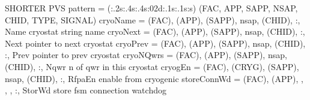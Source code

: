 \documentclass[letterpaper,10pt,english]{sphinxmanual}
\begin{document}
\begin{sphinxVerbatim}[commandchars=\\\{\}]
\PYGZsh{}SHORTER PVS
\PYGZgt{} pattern = (\PYGZob{}:.2s\PYGZcb{}\PYGZob{}:.4s\PYGZcb{}\PYGZob{}:.4s\PYGZcb{}\PYGZob{}:02d\PYGZcb{}\PYGZob{}:.1s\PYGZcb{}\PYGZob{}:.1s\PYGZcb{}\PYGZob{}:s\PYGZcb{}) (FAC, APP, SAPP, NSAP, CHID, TYPE, SIGNAL)
\PYGZdq{}cryoName\PYGZdq{}           = \PYGZdl{}(FAC), \PYGZdl{}(APP), \PYGZdl{}(SAPP), \PYGZlt{}nsap\PYGZgt{}, \PYGZdl{}(CHID), \PYGZdq{}:\PYGZdq{}, \PYGZdq{}Name\PYGZdq{}                           \PYGZsh{}cryostat string name
\PYGZdq{}cryoNext\PYGZdq{}           = \PYGZdl{}(FAC), \PYGZdl{}(APP), \PYGZdl{}(SAPP), \PYGZlt{}nsap\PYGZgt{}, \PYGZdl{}(CHID), \PYGZdq{}:\PYGZdq{}, \PYGZdq{}Next\PYGZdq{}                           \PYGZsh{}pointer to next cryostat
\PYGZdq{}cryoPrev\PYGZdq{}           = \PYGZdl{}(FAC), \PYGZdl{}(APP), \PYGZdl{}(SAPP), \PYGZlt{}nsap\PYGZgt{}, \PYGZdl{}(CHID), \PYGZdq{}:\PYGZdq{}, \PYGZdq{}Prev\PYGZdq{}                           \PYGZsh{}pointer to prev cryostat
\PYGZdq{}cryoNQwrs\PYGZdq{}          = \PYGZdl{}(FAC), \PYGZdl{}(APP), \PYGZdl{}(SAPP), \PYGZlt{}nsap\PYGZgt{}, \PYGZdl{}(CHID), \PYGZdq{}:\PYGZdq{}, \PYGZdq{}Nqwr\PYGZdq{}                           \PYGZsh{}n of qwr in this cryostat
\PYGZdq{}cryogEn\PYGZdq{}            = \PYGZdl{}(FAC), \PYGZdl{}(CRYG), \PYGZdl{}(SAPP), \PYGZlt{}nsap\PYGZgt{}, \PYGZdl{}(CHID), \PYGZdq{}:\PYGZdq{}, \PYGZdq{}RfpaEn\PYGZdq{}                        \PYGZsh{}enable from cryogenic
\PYGZdq{}storeConnWd\PYGZdq{}        = \PYGZdl{}(FAC), \PYGZdl{}(APP), , , , \PYGZdq{}:\PYGZdq{}, \PYGZdq{}StorWd\PYGZdq{}                                             \PYGZsh{}store fsm connection watchdog
\end{sphinxVerbatim}
\end{document}
